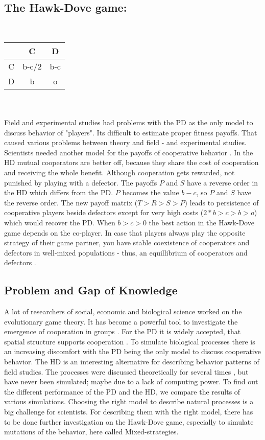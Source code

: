\subsection{The Hawk-Dove game:}
\newline\\
\begin{tabular}{|c|c|c|}
	\hline  & C & D \\ 
	\hline C & b-c/2 & b-c \\ 
	\hline D & b & o \\ 
	\hline 
\end{tabular} \\
\newline\\ 
Field and experimental studies had problems with the PD as the only model to discuss behavior of "players". Its difficult to estimate proper fitness payoffs. That caused various problems between theory and field - and experimental studies. Scientists needed another model for the payoffs of cooperative behavior \citep{milinski1997, nowak1992}. In the HD mutual cooperators are better off, because they share the cost of cooperation and receiving the whole benefit. Although cooperation gets rewarded, not punished by playing with a defector. The payoffs $P$ and $S$ have a reverse order in the HD which differs from the PD. $P$ becomes the value $b-c$, so $P$ and $S$ have the reverse order. The new payoff matrix ($T>R>S>P$) leads to persistence of cooperative players beside defectors except for very high costs ($2*b>c>b>o$) which would recover the PD. When $b>c>0$ the best action in the Hawk-Dove game depends on the co-player. In case that players always play the opposite strategy of their game partner, you have stable coexistence of cooperators and defectors in well-mixed populations - thus, an equillibrium of cooperators and defectors \citep{HauertandDoebeli2004}.

\subsection{Problem and Gap of Knowledge}
A lot of researchers of social, economic and biological science worked on the evolutionary game theory. It has become a powerful tool to investigate the emergence of cooperation in groups \citep{HauertandDoebeli2004}. For the PD it is widely accepted, that spatial structure supports cooperation \citep{nowak1992}. To simulate biological processes there is an increasing discomfort with the PD being the only model to discuss cooperative behavior. The HD is an interesting alternative for describing behavior patterns of field studies\citep{milinski1987}. The processes were discussed theoretically for several times \citep{nowak1992, milinski1987}, but have never been simulated; maybe due to a lack of computing power. To find out the different performance of the PD and  the  HD, we compare the results of various simulations. Choosing the right model to describe natural processes is a big challenge for scientists. For describing them with the right model, there has to be done further investigation on the Hawk-Dove game, especially to simulate mutations of the behavior, here called Mixed-strategies. 

